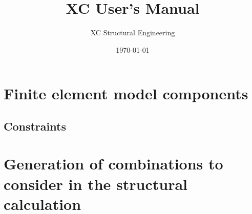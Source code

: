 \documentclass[a4paper,twoside]{book}
\title{XC User's Manual}
\author{XC Structural Engineering}
\date{\today}
\begin{document}
\maketitle
\lstset{language=Python}          %
\setcounter{secnumdepth}{4}
\setcounter{tocdepth}{4}
\tableofcontents
\listoftables


\chapter{Finite element model components}



\section{Constraints}







%









\appendix
\chapter{Generation of combinations to consider in the structural calculation}



\begin{thebibliography}{77}	%
\small				%

\end{thebibliography}
\end{document}
